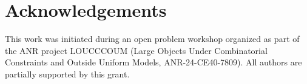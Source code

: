 \documentclass[a4paper,11pt]{amsart}
\theoremstyle{definition}
\begin{document}
\section*{Acknowledgements}
This work was initiated during an open problem workshop organized
as part of the ANR project LOUCCCOUM (Large Objects Under Combinatorial Constraints and Outside Uniform Models, ANR-24-CE40-7809). 
All authors are partially supported by this grant.



\end{document}
